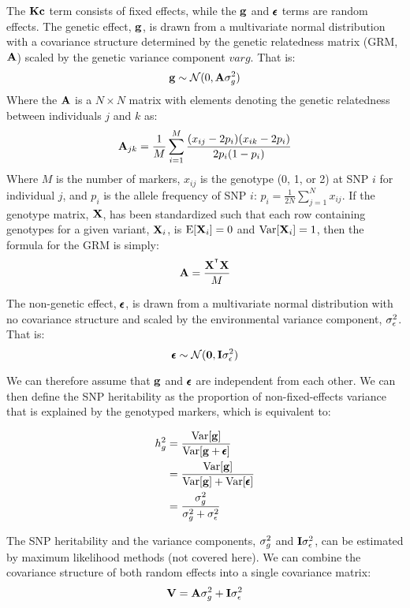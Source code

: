 \documentclass[12pt]{article}
\begin{document}
The $\mathbf{K} \mathbf{c}$ term consists of fixed effects, while the $\mathbf{g}$ and $\pmb{\epsilon}$ terms are random effects.
The genetic effect, $\mathbf{g}$, is drawn from a multivariate normal distribution with a covariance structure determined by the genetic relatedness matrix (GRM, $\mathbf{A}$) scaled by the genetic variance component $varg$. That is:
$$ \mathbf{g} \sim \mathcal{N} (0, \mathbf{A} \sigma_g^2)$$
Where the $\mathbf{A}$ is a $N \times N$ matrix with elements denoting the genetic relatedness between individuals $j$ and $k$ as:
$$ \mathbf{A}_{jk} = \frac{1}{M} \sum_{i=1}^{M}
\frac{(x_{ij} - 2 p_i)(x_{ik} - 2 p_i)}
{2 p_i (1 - p_i)}
$$
Where $M$ is the number of markers, $x_{ij}$ is the genotype (0, 1, or 2) at SNP $i$ for individual $j$, and $p_i$ is the allele frequency of SNP $i$: $p_i = \frac{1}{2 N} \sum_{j=1}^{N} x_{ij}$.
If the genotype matrix, $\mathbf{X}$, has been standardized such that each row containing genotypes for a given variant, $\mathbf{X}_i$, is $\mathrm{E}[\mathbf{X}_i] = 0$ and $\mathrm{Var}[\mathbf{X}_i] = 1$, then the formula for the GRM is simply:
$$ \mathbf{A} = \frac{ \mathbf{X}^{^\intercal} \mathbf{X} }{M} $$

The non-genetic effect, $\pmb{\epsilon}$, is drawn from a multivariate normal distribution with no covariance structure and scaled by the environmental variance component, $\sigma_{\epsilon}^2$. That is:
$$ \pmb{\epsilon} \sim \mathcal{N} (\mathbf{0}, \mathbf{I} \sigma_{\epsilon}^2) $$

We can therefore assume that $\mathbf{g}$ and $\pmb{\epsilon}$ are independent from each other.
We can then define the SNP heritability as the proportion of non-fixed-effects variance that is explained by the genotyped markers, which is equivalent to:

\begin{align*}
    h_g^2 &= \frac{\mathrm{Var}[\mathbf{g}]}{\mathrm{Var}[\mathbf{g} + \pmb{\epsilon}]} \\
    &= \frac{\mathrm{Var}[\mathbf{g}]}{\mathrm{Var}[\mathbf{g}] + \mathrm{Var}[\pmb{\epsilon}]} \\
    &= \frac{\sigma_g^2}{\sigma_g^2 + \sigma_{\epsilon}^2}
\end{align*}

The SNP heritability and the variance components, $\sigma_g^2$ and $\mathbf{I} \sigma_{\epsilon}^2$, can be estimated by maximum likelihood methods (not covered here).
We can combine the covariance structure of both random effects into a single covariance matrix:
$$ \mathbf{V} = \mathbf{A} \sigma_g^2 + \mathbf{I} \sigma_{\epsilon}^2 $$
\end{document}
